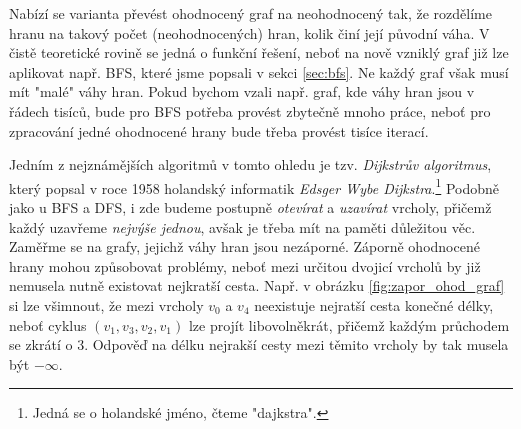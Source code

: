 Nabízí se varianta převést ohodnocený graf na neohodnocený tak, že rozdělíme hranu na takový počet (neohodnocených) hran, kolik činí její původní váha. V čistě teoretické rovině se jedná o funkční řešení, neboť na nově vzniklý graf již lze aplikovat např. BFS, které jsme popsali v sekci \ref{sec:bfs}. Ne každý graf však musí mít "malé" váhy hran. Pokud bychom vzali např. graf, kde váhy hran jsou v řádech tisíců, bude pro BFS potřeba provést zbytečně mnoho práce, neboť pro zpracování jedné ohodnocené hrany bude třeba provést tisíce iterací.

Jedním z nejznámějších algoritmů v tomto ohledu je tzv. \emph{Dijkstrův algoritmus}, který popsal v roce 1958 holandský informatik \emph{Edsger Wybe Dijkstra}.\footnote{Jedná se o holandské jméno, čteme "dajkstra".} Podobně jako u BFS a DFS, i zde budeme postupně \emph{otevírat} a \emph{uzavírat} vrcholy, přičemž každý uzavřeme \emph{nejvýše jednou}, avšak je třeba mít na paměti důležitou věc.
Zaměřme se na grafy, jejichž váhy hran jsou nezáporné. Záporně ohodnocené hrany mohou způsobovat problémy, neboť mezi určitou dvojicí vrcholů by již nemusela nutně existovat nejkratší cesta. Např. v obrázku \ref{fig:zapor_ohod_graf} si lze všimnout, že mezi vrcholy $v_0$ a $v_4$ neexistuje nejratší cesta konečné délky, neboť cyklus $(v_1, v_3, v_2, v_1)$ lze projít libovolněkrát, přičemž každým průchodem se zkrátí o $3$. Odpověď na délku nejrakší cesty mezi těmito vrcholy by tak musela být $-\infty$.
